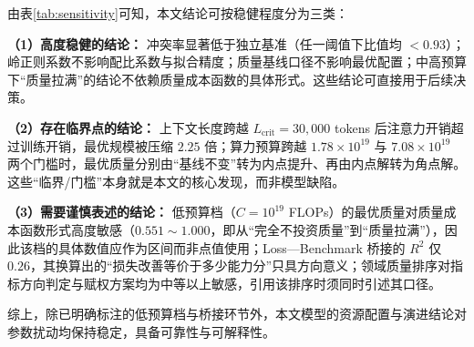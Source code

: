 由表\ref{tab:sensitivity}可知，本文结论可按稳健程度分为三类：

\textbf{（1）高度稳健的结论：} 冲突率显著低于独立基准（任一阈值下比值均 $<0.93$）；岭正则系数不影响配比系数与拟合精度；质量基线口径不影响最优配置；中高预算下“质量拉满”的结论不依赖质量成本函数的具体形式。这些结论可直接用于后续决策。

\textbf{（2）存在临界点的结论：} 上下文长度跨越 $L_{\text{crit}}=30{,}000$ tokens 后注意力开销超过训练开销，最优规模被压缩 $2.25$ 倍；算力预算跨越 $1.78\times10^{19}$ 与 $7.08\times10^{19}$ 两个门槛时，最优质量分别由“基线不变”转为内点提升、再由内点解转为角点解。这些“临界/门槛”本身就是本文的核心发现，而非模型缺陷。

\textbf{（3）需要谨慎表述的结论：} 低预算档（$C=10^{19}$ FLOPs）的最优质量对质量成本函数形式高度敏感（$0.551\sim1.000$，即从“完全不投资质量”到“质量拉满”），因此该档的具体数值应作为区间而非点值使用；Loss—Benchmark 桥接的 $R^2$ 仅 $0.26$，其换算出的“损失改善等价于多少能力分”只具方向意义；领域质量排序对指标方向判定与赋权方案均为中等以上敏感，引用该排序时须同时引述其口径。

综上，除已明确标注的低预算档与桥接环节外，本文模型的资源配置与演进结论对参数扰动均保持稳定，具备可靠性与可解释性。
